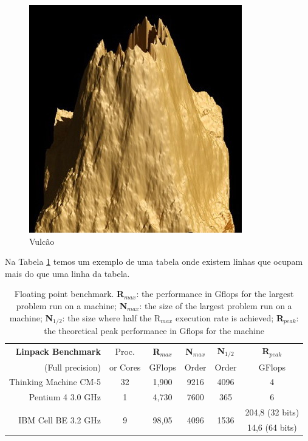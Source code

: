 \begin{figure}
 \centering
 \includegraphics[width=0.5\linewidth]{imgs/tp45a_450}
 \caption{Vulcão}
 \label{fig:volcao}
\end{figure}


Na Tabela \ref{tableBenchmark} temos um exemplo de uma tabela onde existem linhas que ocupam mais do que uma linha da tabela.


\begin{table}
  \caption[exemplo de uma tabela]{Floating point benchmark.
	\textbf{R$_{max}$}: the performance in Gflops for the largest problem run on a machine;
	\textbf{N$_{max}$}: the size of the largest problem run on a machine;
	\textbf{N$_{1/2}$}: the size where half the R$_{max}$ execution rate is achieved;
	\textbf{R$_{peak}$}: the theoretical peak performance in Gflops for the machine}
  \label{tableBenchmark}
  \begin{center} 
  \begin{tabular*}{1\textwidth}{@{\extracolsep{\fill}} rccccc } \toprule
\textbf{Linpack	Benchmark}& Proc.	& \textbf{R$_{max}$} & \textbf{N$_{max}$} & \textbf{N$_{1/2}$}	& \textbf{R$_{peak}$} \\ 
(Full precision)	& or Cores	& GFlops	     & Order		  & Order		& GFlops \\ [0.25ex] \midrule
Thinking Machine CM-5	& 32		& 1,900		     & 9216		  & 4096		& 4 \\
Pentium 4 3.0 GHz & 1	& 4,730		     & 7600		  & 365			& 6 \\
\multirow{2}{*}{IBM Cell BE 3.2 GHz} 	& \multirow{2}{*}{9}& \multirow{2}{*}{98,05} & \multirow{2}{*}{4096} & \multirow{2}{*}{1536} & 204,8 {\scriptsize{(32 bits)}} \\
			&		&		     &			  &			& 14,6 {\scriptsize{(64 bits)}} \\ \bottomrule
  \end{tabular*}
  \end{center}	
\end{table}



